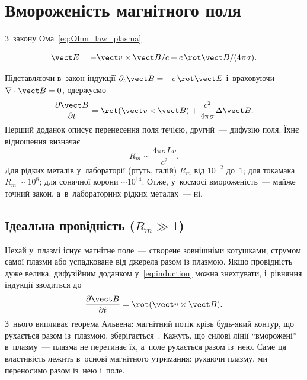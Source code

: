 \section{Вмороженість магнітного поля}


З~закону Ома~\eqref{eq:Ohm_law_plasma}

\begin{equation*}
	 \vect E=-\vect v\times\vect B/c+c\,\rot\vect
	B/(4\pi\sigma).
\end{equation*}

Підставляючи в~закон індукції $\partial_t\vect B=-c\,\rot\vect E$ і~враховуючи
$\nabla\cdot\vect B=0$, одержуємо 
\begin{equation}\label{eq:induction}
	\frac{\partial\vect B}{\partial t}=\rot(\vect v\times\vect B)+\frac{c^2}{4\pi\sigma}\Delta\vect B.
\end{equation}
Перший доданок описує перенесення поля течією, другий~--- дифузію поля. Їхнє відношення
визначає 
\begin{equation*}
	R_m\sim\frac{4\pi\sigma Lv}{c^2}.
\end{equation*}
Для рідких металів у~лабораторії (ртуть, галій) $R_m$ від $10^{-2}$ до~$1$; для токамака $R_m\sim10^{8}$; для сонячної корони $\sim10^{14}$.
Отже, у~космосі вмороженість~--- майже точний закон, а~в~лабораторних рідких металах~--- ні.


\subsection*{Ідеальна провідність (\texorpdfstring{$R_m\gg1$}{R_m >> 1})}


Нехай у~плазмі існує магнітне поле~--- створене зовнішніми котушками, струмом самої плазми
або успадковане від джерела разом із плазмою. Якщо провідність дуже велика, дифузійним
доданком у~\eqref{eq:induction} можна знехтувати, і~рівняння індукції зводиться до
\begin{equation*}
    \frac{\partial\vect B}{\partial t}=\rot(\vect v\times\vect B).
\end{equation*}
З~нього випливає теорема Альвена: магнітний потік крізь будь-який контур, що рухається
разом із~плазмою, зберігається~\cite{anisimov2018}. Кажуть, що силові лінії \enquote{вморожені} в~плазму~---
плазма не перетинає їх, а~поле рухається разом із~нею. Саме ця властивість лежить в~основі
магнітного утримання: рухаючи плазму, ми переносимо разом із~нею і~поле.


